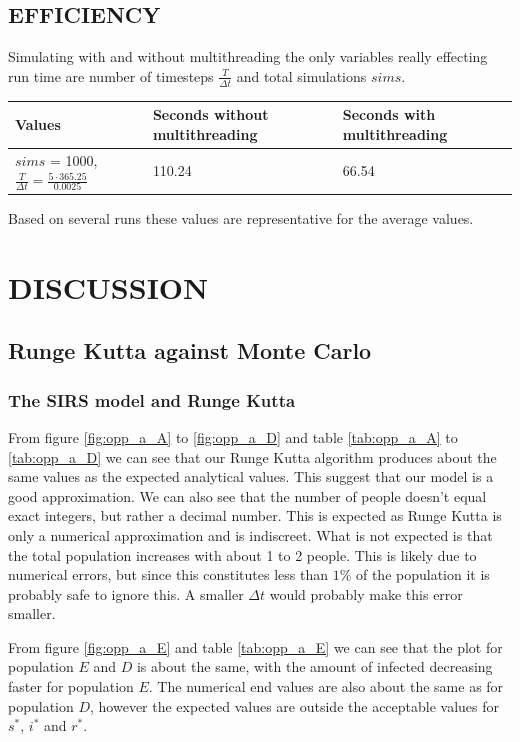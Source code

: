 \documentclass[a4paper]{article}
\let\Oldsection\section
\renewcommand{\section}{\FloatBarrier\Oldsection}
\let\Oldsubsection\subsection
\renewcommand{\subsection}{\FloatBarrier\Oldsubsection}
\let\Oldsubsubsection\subsubsection
\renewcommand{\subsubsection}{\FloatBarrier\Oldsubsubsection}
\begin{document}
	\subsection{EFFICIENCY}
	Simulating with and without multithreading the only variables really effecting run time are number of timesteps $\frac{T}{\Delta t}$ and total simulations $sims$.
	\begin{table}[!htb]
		\centering
		\begin{tabular}{|l|l|l|}
			\hline
			Values & Seconds without multithreading & Seconds with multithreading \\ \hline
			$sims$ = 1000, $\frac{T}{\Delta t}=\frac{5\cdot 365.25}{0.0025}$ & 110.24 & 66.54 \\ \hline
		\end{tabular}
	\end{table}
	Based on several runs these values are representative for the average values.
	\section{DISCUSSION}
	\subsection{Runge Kutta against Monte Carlo}
	\subsubsection{The SIRS model and Runge Kutta}
	From figure \ref{fig:opp_a_A} to \ref{fig:opp_a_D} and table \ref{tab:opp_a_A} to \ref{tab:opp_a_D} we can see that our Runge Kutta algorithm produces about the same values as the expected analytical values. This suggest that our model is a good approximation. We can also see that the number of people doesn't equal exact integers, but rather a decimal number. This is expected as Runge Kutta is only a numerical approximation and is indiscreet. What is not expected is that the total population increases with about 1 to 2 people. This is likely due to numerical errors, but since this constitutes less than $1\%$ of the population it is probably safe to ignore this. A smaller $\Delta t$ would probably make this error smaller. 
	
	From figure \ref{fig:opp_a_E} and table \ref{tab:opp_a_E} we can see that the plot for population $E$ and $D$ is about the same, with the amount of infected decreasing faster for population $E$. The numerical end values are also about the same as for population $D$, however the expected values are outside the acceptable values for $s^*$, $i^*$ and $r^*$. 
	
\end{document}
